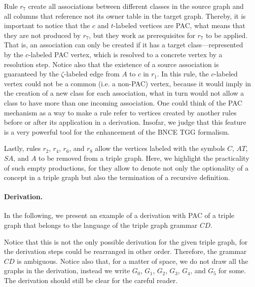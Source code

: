 Rule $r_7$ create all associations between different classes in the source graph and all columns that reference not its owner table in the target graph. Thereby, it is important to notice that the $c$ and $t$-labeled vertices are PAC, what means that they are not produced by $r_7$, but they work as prerequisites for $r_7$ to be applied. That is, an association can only be created if it has a target class---represented by the $c$-labeled PAC vertex, which is resolved to a concrete vertex by a resolution step. Notice also that the existence of a source association is guaranteed by the $\zeta$-labeled edge from $A$ to $c$ in $r_1$. In this rule, the $c$-labeled vertex could not be a common (i.e. a non-PAC) vertex, because it would imply in the creation of a new class for each association, what in turn would not allow a class to have more than one incoming association. One could think of the PAC mechanism as a way to make a rule refer to vertices created by another rules before or after its application in a derivation. Insofar, we judge that this feature is a very powerful tool for the enhancement of the BNCE TGG formalism.

Lastly, rules $r_2$, $r_4$, $r_6$, and $r_8$ allow the vertices labeled with the symbols $C$, $AT$, $SA$, and $A$ to be removed from a triple graph. Here, we highlight the practicality of such empty productions, for they allow to denote not only the optionality of a concept in a triple graph but also the termination of a recursive definition.

\paragraph*{Derivation. } In the following, we present an example of a derivation with PAC of a triple graph that belongs to the language of the triple graph grammar $CD$.



Notice that this is not the only possible derivation for the given triple graph, for the derivation steps could be rearranged in other order. Therefore, the grammar $CD$ is ambiguous. Notice also that, for a matter of space, we do not draw all the graphs in the derivation, instead we write $G_0$, $G_1$, $G_2$, $G_3$, $G_4$, and $G_5$ for some. The derivation should still be clear for the careful reader.

